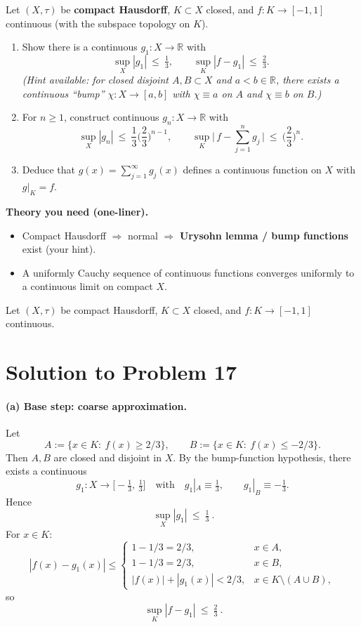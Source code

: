\documentclass[12pt,a4paper]{article}
\theoremstyle{plain}
\theoremstyle{definition}
\theoremstyle{remark}
\theoremstyle{remark}
\begin{document}
	
		Let $(X,\tau)$ be \textbf{compact Hausdorff}, $K\subset X$ closed, and $f:K\to[-1,1]$ continuous (with the subspace topology on $K$).
	
	\begin{enumerate}[label=(\alph*), leftmargin=1.2cm]
		\item Show there is a continuous $g_1:X\to\mathbb R$ with
		\[
		\sup_X |g_1|\ \le\ \tfrac{1}{3}, 
		\qquad
		\sup_K |f-g_1|\ \le\ \tfrac{2}{3}.
		\]
		\emph{(Hint available: for closed disjoint $A,B\subset X$ and $a<b\in\mathbb R$, there exists a continuous ``bump'' $\chi:X\to[a,b]$ with $\chi\equiv a$ on $A$ and $\chi\equiv b$ on $B$.)}
		
		\item For $n\ge 1$, construct continuous $g_n:X\to\mathbb R$ with
		\[
		\sup_X |g_n|\ \le\ \frac{1}{3}\Big(\frac{2}{3}\Big)^{n-1},
		\qquad
		\sup_K\Big|\,f-\sum_{j=1}^{n} g_j\,\Big|\ \le\ \Big(\frac{2}{3}\Big)^{n}.
		\]
		
		\item Deduce that $g(x)=\sum_{j=1}^{\infty} g_j(x)$ defines a continuous function on $X$
		with $g|_{K}=f$.
	\end{enumerate}
	
	\bigskip
	\noindent\textbf{Theory you need (one-liner).}
	\begin{itemize}
		\item Compact Hausdorff $\Rightarrow$ normal $\Rightarrow$ \textbf{Urysohn lemma / bump functions} exist (your hint).
		\item A uniformly Cauchy sequence of continuous functions converges uniformly to a continuous limit on compact $X$.
	\end{itemize}
	
	Let $(X,\tau)$ be compact Hausdorff, $K\subset X$ closed, and $f:K\to[-1,1]$ continuous.
	
\section*{Solution to Problem 17}

\paragraph{(a) Base step: coarse approximation.}
Let
\[
A:=\{x\in K:\ f(x)\ge 2/3\},\qquad B:=\{x\in K:\ f(x)\le -2/3\}.
\]
Then $A,B$ are closed and disjoint in $X$. By the bump-function hypothesis, there exists a continuous
\[
g_1:X\longrightarrow\Big[-\tfrac{1}{3},\,\tfrac{1}{3}\Big]
\quad\text{with}\quad
g_1|_A\equiv\tfrac{1}{3},\qquad g_1|_B\equiv -\tfrac{1}{3}.
\]
Hence
\[
\boxed{\ \sup_X |g_1|\ \le\ \tfrac{1}{3}\ }.
\]
For $x\in K$:
\[
|f(x)-g_1(x)|\le
\begin{cases}
	1-1/3=2/3,& x\in A,\\
	1-1/3=2/3,& x\in B,\\
	|f(x)|+|g_1(x)|<2/3,& x\in K\setminus(A\cup B),
\end{cases}
\]
so
\[
\boxed{\ \sup_{K}|f-g_1|\ \le\ \tfrac{2}{3}\ }.
\]
\end{document}
